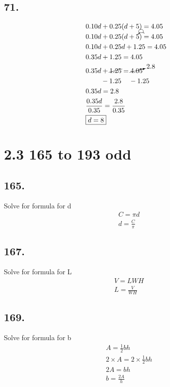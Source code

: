 \documentclass{article}
\newcommand{\tikzmark}[1]{\tikz[overlay,remember picture] \node (#1) {};}
\newcommand{\DrawBox}[2]{%
    \begin{tikzpicture}[overlay,remember picture]
        \draw[->,shorten >=5pt,shorten <=5pt,out=70,in=130,distance=0.5cm,#1] (MarkA.north) to (MarkC.north);
        \draw[->,shorten >=5pt,shorten <=5pt,out=50,in=140,distance=0.3cm,#2] (MarkA.north) to (MarkB.north);
    \end{tikzpicture}
}
\begin{document}
    \subsection*{71.}
    \begin{align*}
        & 0.10d + 0.25(d + 5) = 4.05\\
        & 0.10d + \tikzmark{MarkA}0.25(d\tikzmark{MarkB}+5\tikzmark{MarkC})\DrawBox{black}{black} = 4.05\\
        & 0.10d + 0.25d + 1.25 = 4.05\\
        & 0.35d + 1.25 = 4.05\\
        & 0.35d + \cancel{1.25} = \cancelto{2.8}{4.05}\\
        & \hspace{.8cm} - 1.25 \hspace{.4cm} - 1.25\\
        & 0.35d = 2.8\\
        & \frac{0.35d}{0.35} = \frac{2.8}{0.35} \\
        & \boxed{d = 8} \\
    \end{align*}


    \section*{2.3 165 to 193 odd}
    \subsection*{165.}
    Solve for formula for d
    \begin{align*}
        &  C =  \pi d\\
        & \boxed{d = \frac{C}{\pi}}
    \end{align*}

    \subsection*{167.}
    Solve for formula for L
    \begin{align*}
        &  V = LWH\\
        & \boxed{L = \frac{V}{WH}}
    \end{align*}

    \subsection*{169.}
    Solve for formula for b
    \begin{align*}
        &  A = \frac{1}{2}bh \\
        & 2 \times A = 2 \times \frac{1}{2}bh \\
        &  2A = bh \\
        & \boxed{b = \frac{2A}{h}} \\
    \end{align*}
\end{document}
